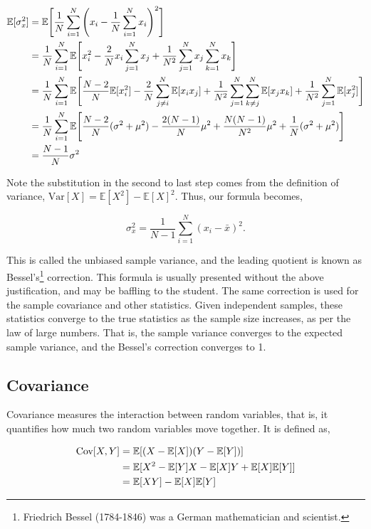 \documentclass[11pt]{amsart}
\begin{document}
\begin{align}
\mathbb{E}[\sigma_x^2] &= \mathbb{E}\Bigg[\frac{1}{N}\sum_{i=1}^N\Bigg(x_i - \frac{1}{N}\sum_{i=1}^N x_i\Bigg)^2 \Bigg] \notag \\
&=\frac{1}{N}\sum_{i=1}^N\mathbb{E}\Bigg[x_i^2 - \frac{2}{N}x_i\sum_{j=1}^N x_j + \frac{1}{N^2}\sum_{j=1}^N x_j \sum_{k=1}^N x_k\Bigg] \notag \\
&=\frac{1}{N}\sum_{i=1}^N\mathbb{E}\Bigg[\frac{N-2}{N}\mathbb{E}[x_i^2] - \frac{2}{N}\sum_{j\neq i}^N \mathbb{E}[x_ix_j] + \frac{1}{N^2}\sum_{j=1}^N \sum_{k\neq j}^N \mathbb{E}[x_jx_k] + \frac{1}{N^2}\sum_{j=1}^N \mathbb{E}[x_j^2]\Bigg] \notag \\
&=\frac{1}{N}\sum_{i=1}^N\mathbb{E}\Bigg[\frac{N-2}{N}(\sigma^2 + \mu^2) - \frac{2(N - 1)}{N} \mu^2 + \frac{N(N-1)}{N^2} \mu^2 + \frac{1}{N} (\sigma^2 + \mu^2)\Bigg] \notag \\
&= \frac{N-1}{N}\sigma^2 \notag
\end{align}

Note the substitution in the second to last step comes from the definition of variance, $\text{Var}[X] = \mathbb{E}[X^2] - \mathbb{E}[X]^2$. Thus, our formula becomes,

$$\sigma_x^2 = \frac{1}{N-1}\sum_{i=1}^N (x_i - \bar{x})^2.$$

This is called the unbiased sample variance, and the leading quotient is known as Bessel's\footnote{Friedrich Bessel (1784-1846) was a German mathematician and scientist.} correction. This formula is usually presented without the above justification, and may be baffling to the student. The same correction is used for the sample covariance and other statistics. Given independent samples, these statistics converge to the true statistics as the sample size increases, as per the law of large numbers. That is, the sample variance converges to the expected sample variance, and the Bessel's correction converges to 1.

\subsection{Covariance}

Covariance measures the interaction between random variables, that is, it quantifies how much two random variables move together. It is defined as,

\begin{align}
\text{Cov}[X, Y] &= \mathbb{E}[(X - \mathbb{E}[X])(Y - \mathbb{E}[Y])] \notag \\
&= \mathbb{E}[X^2 - \mathbb{E}[Y]X - \mathbb{E}[X]Y + \mathbb{E}[X]\mathbb{E}[Y]] \notag \\
&= \mathbb{E}[XY] - \mathbb{E}[X]\mathbb{E}[Y] \notag
\end{align}
\end{document}
